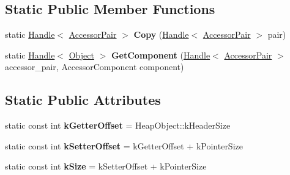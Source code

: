 \subsection*{Static Public Member Functions}
\begin{DoxyCompactItemize}
\item 
static \hyperlink{classv8_1_1internal_1_1_handle}{Handle}$<$ \hyperlink{classv8_1_1internal_1_1_accessor_pair}{Accessor\+Pair} $>$ {\bfseries Copy} (\hyperlink{classv8_1_1internal_1_1_handle}{Handle}$<$ \hyperlink{classv8_1_1internal_1_1_accessor_pair}{Accessor\+Pair} $>$ pair)\hypertarget{classv8_1_1internal_1_1_accessor_pair_a9030ddc2b46863a79de840206d6c549c}{}\label{classv8_1_1internal_1_1_accessor_pair_a9030ddc2b46863a79de840206d6c549c}

\item 
static \hyperlink{classv8_1_1internal_1_1_handle}{Handle}$<$ \hyperlink{classv8_1_1internal_1_1_object}{Object} $>$ {\bfseries Get\+Component} (\hyperlink{classv8_1_1internal_1_1_handle}{Handle}$<$ \hyperlink{classv8_1_1internal_1_1_accessor_pair}{Accessor\+Pair} $>$ accessor\+\_\+pair, Accessor\+Component component)\hypertarget{classv8_1_1internal_1_1_accessor_pair_a432a76bc810fc281eb04f2b0b1ae8772}{}\label{classv8_1_1internal_1_1_accessor_pair_a432a76bc810fc281eb04f2b0b1ae8772}

\end{DoxyCompactItemize}
\subsection*{Static Public Attributes}
\begin{DoxyCompactItemize}
\item 
static const int {\bfseries k\+Getter\+Offset} = Heap\+Object\+::k\+Header\+Size\hypertarget{classv8_1_1internal_1_1_accessor_pair_aa7ee07b7098a35f0e1340c33dadb90db}{}\label{classv8_1_1internal_1_1_accessor_pair_aa7ee07b7098a35f0e1340c33dadb90db}

\item 
static const int {\bfseries k\+Setter\+Offset} = k\+Getter\+Offset + k\+Pointer\+Size\hypertarget{classv8_1_1internal_1_1_accessor_pair_adaca2d4fb0dfcf2e29fd37fc5549737b}{}\label{classv8_1_1internal_1_1_accessor_pair_adaca2d4fb0dfcf2e29fd37fc5549737b}

\item 
static const int {\bfseries k\+Size} = k\+Setter\+Offset + k\+Pointer\+Size\hypertarget{classv8_1_1internal_1_1_accessor_pair_a89c0268865b5203f29820f82b5e46cb5}{}\label{classv8_1_1internal_1_1_accessor_pair_a89c0268865b5203f29820f82b5e46cb5}

\end{DoxyCompactItemize}
